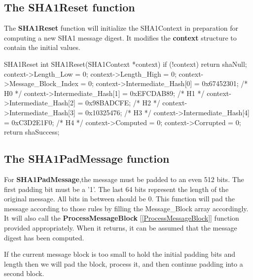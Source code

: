 \subsection{The SHA1Reset function}
\noindent
The {\bf SHA1Reset} function will initialize the SHA1Context in preparation
for computing a new SHA1 message digest. It modifies the {\bf context}
structure to contain the initial values.
\begin{chunk}{SHA1Reset}
int SHA1Reset(SHA1Context *context) {
  if (!context) {
    return shaNull;
  }
  context->Length_Low             = 0;
  context->Length_High            = 0;
  context->Message_Block_Index    = 0;
  context->Intermediate_Hash[0]   = 0x67452301;  /* H0 */
  context->Intermediate_Hash[1]   = 0xEFCDAB89;  /* H1 */
  context->Intermediate_Hash[2]   = 0x98BADCFE;  /* H2 */
  context->Intermediate_Hash[3]   = 0x10325476;  /* H3 */
  context->Intermediate_Hash[4]   = 0xC3D2E1F0;  /* H4 */
  context->Computed   = 0;
  context->Corrupted  = 0;
  return shaSuccess;
}

\end{chunk}

\subsection{The SHA1PadMessage function}
For {\bf SHA1PadMessage},the message must be padded to an even
512 bits. The first padding bit must be a '1'.  The last 64
bits represent the length of the original message.  All bits in
between should be 0.  This function will pad the message
according to those rules by filling the Message\_Block array
accordingly.  It will also call the 
{\bf ProcessMessageBlock} [\ref{ProcessMessageBlock}] function
provided appropriately.  When it returns, it can be assumed that
the message digest has been computed.

If the current message block is too small to hold the initial padding
bits and length then we will pad the block, process it, and then
continue padding into a second block.

